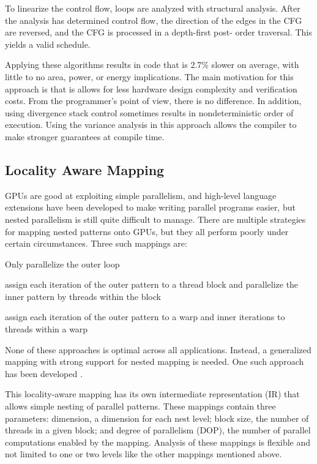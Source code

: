 \documentclass[prodmode,acmtecs]{acmsmall} %
\begin{document}
To linearize the control flow, loops are analyzed with structural analysis.
After the analysis has determined control flow, the direction of the edges in
the CFG are reversed, and the CFG is processed in a depth-first post- order
traversal. This yields a valid schedule.

Applying these algorithms results in code that is 2.7\% slower on average, with
little to no area, power, or energy implications. The main motivation for this
approach is that is allows for less hardware design complexity and verification
costs. From the programmer's point of view, there is no difference. In addition,
using divergence stack control sometimes results in nondeterministic order of
execution. Using the variance analysis in this approach allows the compiler to
make stronger guarantees at compile time.

\subsection{Locality Aware Mapping}
GPUs are good at exploiting simple parallelism, and high-level language
extensions have been developed to make writing parallel programs easier, but
nested parallelism is still quite difficult to manage. There are multiple
strategies for mapping nested patterns onto GPUs, but they all perform poorly
under certain circumstances. Three such mappings are:
\begin{description}
  \setlength\itemsep{0.5em}
  \item[1D mapping] Only parallelize the outer loop
  \item[Thread-block/thread mapping]assign each iteration of the outer pattern
  to a thread block and parallelize the inner pattern by threads within the
  block
  \item[Warp-based mapping] assign each iteration of the outer pattern to a warp
  and inner iterations to threads within a warp
\end{description}
None of these approaches is optimal across all applications. Instead, a
generalized mapping with strong support for nested mapping is needed. One such
approach has been developed \cite{LocalityAwareMappingOfNestedParallelPatterns}.

This locality-aware mapping has its own intermediate representation (IR) that
allows simple nesting of parallel patterns. These mappings contain three
parameters: dimension, a dimension for each nest level; block size, the number
of threads in a given block; and degree of parallelism (DOP), the number of
parallel computations enabled by the mapping. Analysis of these mappings is
flexible and not limited to one or two levels like the other mappings mentioned
above.
\end{document}
